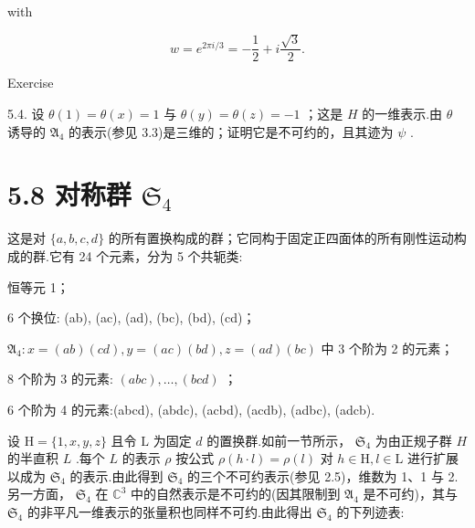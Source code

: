 \documentclass[10pt]{article}
\begin{document}
with

\[
w = {e}^{{2\pi i}/3} =  - \frac{1}{2} + i\frac{\sqrt{3}}{2}.
\]

Exercise

5.4. 设 \(\theta \left( 1\right)  = \theta \left( x\right)  = 1\) 与 \(\theta \left( y\right)  = \theta \left( z\right)  =  - 1\) ；这是 \(H\) 的一维表示.由 \(\theta\) 诱导的 \({\mathfrak{A}}_{4}\) 的表示(参见 3.3)是三维的；证明它是不可约的，且其迹为 \(\psi\) .

\section*{5.8 对称群 \({\mathfrak{S}}_{4}\)}

这是对 \(\{ a,b,c,d\}\) 的所有置换构成的群；它同构于固定正四面体的所有刚性运动构成的群.它有 24 个元素，分为 5 个共轭类:

恒等元 1；

6 个换位: (ab), (ac), (ad), (bc), (bd), (cd)；

\({\mathfrak{A}}_{4} : x = \left( {ab}\right) \left( {cd}\right) ,y = \left( {ac}\right) \left( {bd}\right) ,z = \left( {ad}\right) \left( {bc}\right)\) 中 3 个阶为 2 的元素；

8 个阶为 3 的元素: \(\left( {abc}\right) ,\ldots ,\left( {bcd}\right)\) ；

6 个阶为 4 的元素:(abcd), (abdc), (acbd), (acdb), (adbc), (adcb).

设 \(\mathrm{H} = \{ 1,x,y,z\}\) 且令 \(\mathrm{L}\) 为固定 \(d\) 的置换群.如前一节所示， \({\mathfrak{S}}_{4}\) 为由正规子群 \(H\) 的半直积 \(L\) .每个 \(L\) 的表示 \(\rho\) 按公式 \(\rho \left( {h \cdot  l}\right)  = \rho \left( l\right)\) 对 \(h \in  \mathrm{H},l \in  \mathrm{L}\) 进行扩展以成为 \({\mathfrak{S}}_{4}\) 的表示.由此得到 \({\mathfrak{S}}_{4}\) 的三个不可约表示(参见 2.5)，维数为 1、1 与 2.另一方面， \({\mathfrak{S}}_{4}\) 在 \({\mathbb{C}}^{3}\) 中的自然表示是不可约的(因其限制到 \({\mathfrak{A}}_{4}\) 是不可约)，其与 \({\mathfrak{S}}_{4}\) 的非平凡一维表示的张量积也同样不可约.由此得出 \({\mathfrak{S}}_{4}\) 的下列迹表:

\begin{center}
\end{center}
\end{document}
